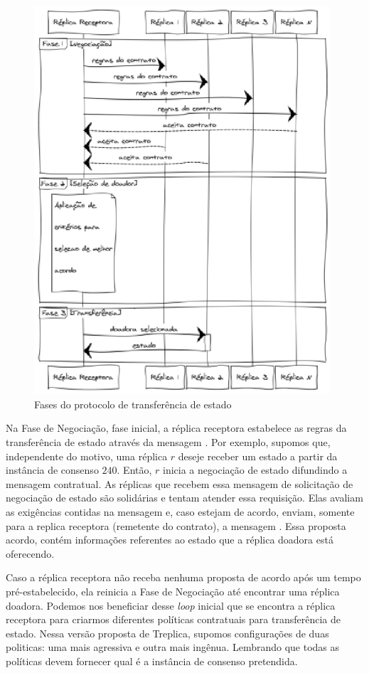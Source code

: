 \begin{figure}[ht]
  \centering
  \includegraphics[width=11cm]{conteudo/capitulos/figuras/fases_protocolo.eps}
  \caption{Fases do protocolo de transferência de estado}
  \label{fig:fases_protocolo}
\end{figure}

Na Fase de Negociação, fase inicial, a réplica receptora estabelece as regras da
transferência de estado através da mensagem . Por exemplo,
supomos que, independente do motivo, uma réplica $r$ deseje receber um estado a partir da
instância de consenso $240$. Então, $r$ inicia a negociação de estado difundindo a
mensagem contratual. As réplicas que recebem essa mensagem de solicitação de negociação de
estado são solidárias e tentam atender essa requisição. Elas avaliam as exigências
contidas na mensagem e, caso estejam de acordo, enviam, somente para a replica receptora
(remetente do contrato), a mensagem . Essa proposta acordo, contém
informações referentes ao estado que a réplica doadora está oferecendo.

Caso a réplica receptora não receba nenhuma proposta de acordo após um tempo
pré-estabelecido, ela reinicia a Fase de Negociação até encontrar uma réplica doadora.
Podemos nos beneficiar desse \emph{loop} inicial que se encontra a réplica receptora para
criarmos diferentes políticas contratuais para transferência de estado. Nessa versão
proposta de Treplica, supomos configurações de duas politicas: uma mais agressiva e outra
mais ingênua. Lembrando que todas as políticas devem fornecer qual é a instância de
consenso pretendida.

